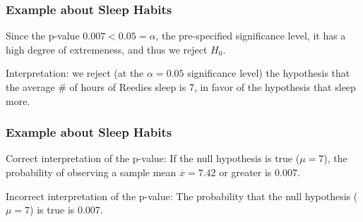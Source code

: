\documentclass[handout]{beamer}
\newcommand{\blue}[1]{\textcolor{blue2}{#1}}
\newcommand{\xbar}{\overline{x}}
\begin{document}
\begin{frame}
\frametitle{Example about Sleep Habits}
Since the p-value $0.007 < 0.05=\alpha$, the \blue{pre-specified} significance level, it has a high degree of \blue{extremeness}, and thus we \blue{reject $H_0$}.

\vspace{0.5cm}

\pause\blue{Interpretation}: we reject (at the $\alpha=0.05$ significance level) the hypothesis that the average \# of hours of Reedies sleep is 7, in favor of the hypothesis that sleep more.    

\end{frame}


\begin{frame}
\frametitle{Example about Sleep Habits}
\blue{Correct interpretation of the p-value}:  If the null hypothesis is true ($\mu=7$), the probability of observing a sample mean $\xbar=7.42$ or greater is 0.007.  

\vspace{0.5cm}

\pause \blue{Incorrect interpretation of the p-value}:  The probability that the null hypothesis ($\mu=7$) is true is 0.007.  

\end{frame}



%
%
\end{document}
